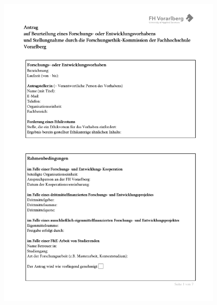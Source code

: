 \documentclass[a4paper,12pt,twoside,numbers=noendperiod]{scrreprt}
\begin{document}
\begin{figure}[ht]
    \centering
    \begin{minipage}[t]{.49\linewidth}
        \includegraphics[width=\linewidth]{thesis/images/Luidold_Word-Vorlage-FHV-1.png}
    \end{minipage}
    \begin{minipage}[b]{.49\linewidth}

\end{minipage}
\end{figure}
\end{document}
